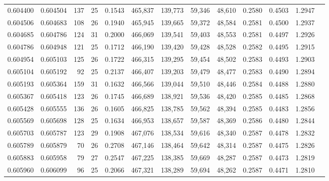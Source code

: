 \begin{tabular}{rrrrrrrrrrrrr}
0.604400 & 0.604504 &   137 &  25 &                                     0.1543 & 465,837 & 139,773 &  59,346 &  48,610 & 0.2580 & 0.4503 & 1.2947 \\
0.604506 & 0.604683 &   108 &  26 &                                     0.1940 & 465,945 & 139,665 &  59,372 &  48,584 & 0.2581 & 0.4500 & 1.2937 \\
0.604685 & 0.604786 &   124 &  31 &                                     0.2000 & 466,069 & 139,541 &  59,403 &  48,553 & 0.2581 & 0.4497 & 1.2926 \\
0.604786 & 0.604948 &   121 &  25 &                                     0.1712 & 466,190 & 139,420 &  59,428 &  48,528 & 0.2582 & 0.4495 & 1.2915 \\
0.604954 & 0.605103 &   125 &  26 &                                     0.1722 & 466,315 & 139,295 &  59,454 &  48,502 & 0.2583 & 0.4493 & 1.2903 \\
0.605104 & 0.605192 &    92 &  25 &                                     0.2137 & 466,407 & 139,203 &  59,479 &  48,477 & 0.2583 & 0.4490 & 1.2894 \\
0.605193 & 0.605364 &   159 &  31 &                                     0.1632 & 466,566 & 139,044 &  59,510 &  48,446 & 0.2584 & 0.4488 & 1.2880 \\
0.605367 & 0.605418 &   123 &  26 &                                     0.1745 & 466,689 & 138,921 &  59,536 &  48,420 & 0.2585 & 0.4485 & 1.2868 \\
0.605428 & 0.605555 &   136 &  26 &                                     0.1605 & 466,825 & 138,785 &  59,562 &  48,394 & 0.2585 & 0.4483 & 1.2856 \\
0.605569 & 0.605698 &   128 &  25 &                                     0.1634 & 466,953 & 138,657 &  59,587 &  48,369 & 0.2586 & 0.4480 & 1.2844 \\
0.605703 & 0.605787 &   123 &  29 &                                     0.1908 & 467,076 & 138,534 &  59,616 &  48,340 & 0.2587 & 0.4478 & 1.2832 \\
0.605789 & 0.605879 &    70 &  26 &                                     0.2708 & 467,146 & 138,464 &  59,642 &  48,314 & 0.2587 & 0.4475 & 1.2826 \\
0.605883 & 0.605958 &    79 &  27 &                                     0.2547 & 467,225 & 138,385 &  59,669 &  48,287 & 0.2587 & 0.4473 & 1.2819 \\
0.605960 & 0.606099 &    96 &  25 &                                     0.2066 & 467,321 & 138,289 &  59,694 &  48,262 & 0.2587 & 0.4471 & 1.2810 \\

\end{tabular}
